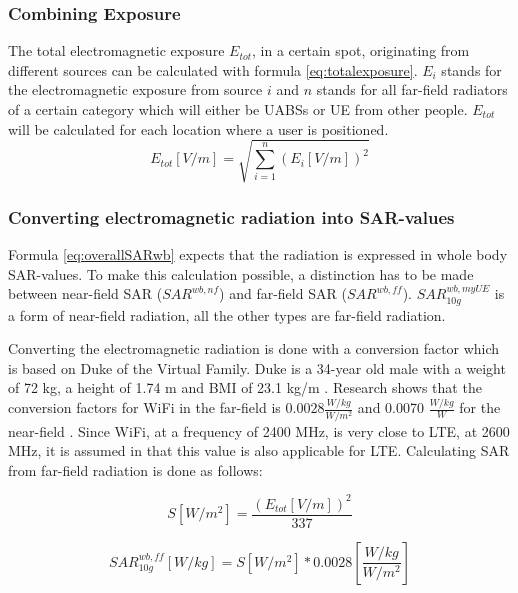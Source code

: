 \documentclass[twocolumn]{phdsymp} %
\begin{document}
\subsubsection{Combining Exposure}
The total electromagnetic exposure $E_{tot}$, in a certain spot, originating from different sources can be calculated with formula \ref{eq:totalexposure}. $E_i$ stands for 
the electromagnetic exposure from source $i$ and
$n$ stands for all far-field radiators of a certain category which will either be \gls{UABS}s or UE from other people.
$E_{tot}$ will be calculated for each location where a user is positioned.  
\begin{equation}
E_{tot} [V/m] = \sqrt{\sum_{i=1}^{n} (E_i [V/m]) ^2}
\label{eq:totalexposure}
\end{equation}

\subsubsection{Converting electromagnetic radiation into SAR-values}
Formula \ref{eq:overallSARwb} expects that the radiation is expressed in whole body \gls{SAR}-values.
To make this calculation possible, a distinction has to be made between near-field \gls{SAR}
($SAR^{wb,nf}$) and far-field \gls{SAR} ($SAR^{wb,ff}$). $SAR^{wb,myUE}_{10g}$ is a form of near-field radiation, 
all the other types are far-field radiation.

Converting the electromagnetic radiation is done with a conversion factor which is based 
on Duke of the Virtual Family. Duke is a 34-year old male with a weight of 72 kg, a height of 1.74 m and BMI of 23.1 kg/m \cite{J22_plets2015joint}. 
Research shows that the conversion factors for WiFi in the far-field is $0.0028 \frac{W/kg}{W/m^2}$
and 0.0070 $\frac{W/kg}{W}$ for the near-field \cite{J22_plets2015joint}.
Since WiFi, at a frequency of 2400 MHz,
is very close to \gls{LTE}, at 2600 MHz, it is assumed in \cite{J22_plets2015joint} that this value is also applicable for \gls{LTE}.
Calculating \gls{SAR} from far-field radiation is done as follows:

\begin{equation}
S [W/m^2]= \frac{(E_{tot} [V/m])^2}{337}
\label{eq:flux}
\end{equation}

\begin{equation}
SAR^{wb,ff}_{10g} [W/kg]= S [W/m^2]* 0.0028 \left[\frac{W/kg}{W/m^2}\right]
\label{eq:DLconversion}
\end{equation}
\end{document}
